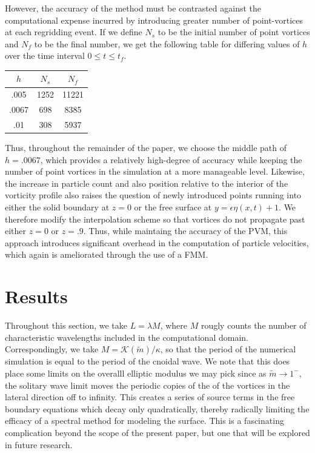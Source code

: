 \documentclass[a4paper,11pt]{article}
\begin{document}
However, the accuracy of the method must be contrasted against the computational expense incurred by introducing greater number of point-vortices at each regridding event.  If we define $N_{s}$ to be the initial number of point vortices and $N_{f}$ to be the final number, we get the following table for differing values of $h$ over the time interval $0\leq t \leq t_{f}$.
\begin{center}
\begin{tabular}{c|cc}
$h$ & $N_{s}$ & $N_{f}$\\
\hline
.005 & 1252 & 11221\\
.0067 & 698 & 8385\\
.01 & 308 & 5937
\end{tabular}
\end{center}
Thus, throughout the remainder of the paper, we choose the middle path of $h=.0067$, which provides a relatively high-degree of accuracy while keeping the number of point vortices in the simulation at a more manageable level.  Likewise, the increase in particle count and also position relative to the interior of the vorticity profile also raises the question of newly introduced points running into either the solid boundary at $z=0$ or the free surface at $y=\epsilon\eta(x,t)+1$.  We therefore modify the interpolation scheme so that vortices do not propagate past either $z=0$ or $z=.9$.    Thus, while maintaing the accuracy of the PVM, this approach introduces significant overhead in the computation of particle velocities, which again is ameliorated through the use of a FMM.  

\section*{Results}
Throughout this section, we take $L = \lambda M$, where $M$ rougly counts the number of characteristic wavelengths included in the computational domain.   Correspondingly, we take $M=\mathcal{K}(\tilde{m})/\kappa$, so that the period of the numerical simulation is equal to the period of the cnoidal wave.   We note that this does place some limits on the overalll elliptic modulus we may pick since as $\tilde{m}\rightarrow 1^{-}$, the solitary wave limit moves the periodic copies of the of the vortices in the lateral direction off to infinity.  This creates a series of source terms in the free boundary equations which decay only quadratically, thereby radically limiting the efficacy of a spectral method for modeling the surface.  This is a fascinating complication beyond the scope of the present paper, but one that will be explored in future research.  
\end{document}
